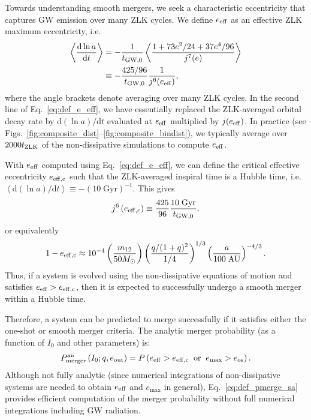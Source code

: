 \documentclass[
        fleqn,
        usenatbib,
    ]{mnras}
\newcommand*{\rd}[2]{\frac{\mathrm{d}#1}{\mathrm{d}#2}}
\newcommand*{\rdil}[2]{\mathrm{d}#1/\mathrm{d}#2}
\newcommand*{\ev}[1]{\left\langle#1\right\rangle}
\newcommand*{\p}[1]{\left(#1\right)}
\begin{document}
Towards understanding smooth mergers, we seek a characteristic eccentricity that
captures GW emission over many ZLK cycles. We define $e_{\rm eff}$ as an
effective ZLK maximum eccentricity, i.e.
\begin{align}
    \ev{\rd{\ln a}{t}} &= -\frac{1}{t_{\rm GW, 0}}
            \ev{\frac{1 + 73e^2/24 + 37e^4/96}
                {j^7(e)}}\nonumber\\
        &\equiv -\frac{425/96}{t_{\rm GW, 0}}\frac{1}{j^6(e_{\rm eff})},
        \label{eq:def_e_eff}
\end{align}
where the angle brackets denote averaging over many ZLK cycles. In the second
line of Eq.~\eqref{eq:def_e_eff}, we have essentially replaced the ZLK-averaged
orbital decay rate by $\rdil{(\ln a)}{t}$ evaluated at $e_{\rm eff}$ multiplied
by $j(e_{\rm eff})$. In practice (see
Figs.~\ref{fig:composite_dist}--\ref{fig:composite_bindist}), we typically
average over $2000 t_{\rm ZLK}$ of the non-dissipative simulations to compute
$e_{\rm eff}$.

With $e_{\rm eff}$ computed using Eq.~\eqref{eq:def_e_eff}, we can define the
critical effective eccentricity $e_{\rm eff, c}$ such that the ZLK-averaged
inspiral time is a Hubble time, i.e.\ $\ev{\rdil{(\ln a)}{t}} \equiv
-\p{10\;\mathrm{Gyr}}^{-1}$. This gives
\begin{align}
    j^6\p{e_{\rm eff, c}} \equiv \frac{425}{96}\frac{10\;\mathrm{Gyr}}{t_{\rm
        GW, 0}}, \label{eq:def_e_eff_c}
\end{align}
or equivalently
\begin{align}
    1 - e_{\rm eff, c} \approx 10^{-4}
        \p{\frac{m_{12}}{50M_{\odot}}}
        \p{\frac{q / (1 + q)^2}{1/4}}^{1/3}
        \p{\frac{a}{100\;\mathrm{AU}}}^{-4/3}.
\end{align}
Thus, if a system is evolved using the non-dissipative equations of motion and
satisfies $e_{\rm eff} > e_{\rm eff, c}$, then it is expected to successfully
undergo a smooth merger within a Hubble time.

Therefore, a system can be predicted to merge successfully if it satisfies either
the one-shot or smooth merger criteria. The analytic merger probability (as a
function of $I_0$ and other parameters) is:
\begin{align}
    P_{\rm merger}^{\rm an}\p{I_0; q, e_{\rm out}} =
        P\p{e_{\rm eff} > e_{\rm eff, c} \;\;\text{or}\;\;
        e_{\max} > e_{\rm os}}.\label{eq:def_pmerge_sa}
\end{align}
Although not fully analytic (since numerical integrations of non-dissipative
systems are needed to obtain $e_{\rm eff}$ and $e_{\max}$ in general),
Eq.~\eqref{eq:def_pmerge_sa} provides efficient computation of the merger
probability without full numerical integrations including GW radiation.
\end{document}
